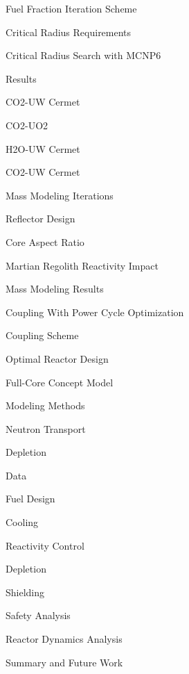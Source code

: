 \documentclass{report}
\begin{document}
\begin{outline}
\begin{outline}
\begin{outline}
          \item { Fuel Fraction Iteration Scheme }
          \end{outline}
      \item { Critical Radius Requirements }
          \begin{outline}
          \item { Critical Radius Search with MCNP6}
          \item { Results }
              \begin{outline}
              \item {CO2-UW Cermet}
              \item {CO2-UO2}
              \item {H2O-UW Cermet}
              \item {CO2-UW Cermet}
              \end{outline}
          \end{outline}
          \item { Mass Modeling Iterations }
              \begin{outline}
              \item { Reflector Design }
              \item { Core Aspect Ratio }
              \item { Martian Regolith Reactivity Impact }
              \end{outline}
          \item { Mass Modeling Results }
      \end{outline}
  \item { Coupling With Power Cycle Optimization }
        \begin{outline}
        \item { Coupling Scheme }
        \item { Optimal Reactor Design }
        \end{outline}
  \item { Full-Core Concept Model }
        \begin{outline}
        \item { Modeling Methods }
            \begin{outline}
            \item { Neutron Transport }
            \item { Depletion }
            \item { Data }
            \end{outline}
        \item { Fuel Design }
        \item { Cooling }
        \item { Reactivity Control }
        \item { Depletion }
        \item { Shielding }
        \item { Safety Analysis }
        \item { Reactor Dynamics Analysis }
        \end{outline}
  \item { Summary and Future Work }
\end{outline}
\end{document}
